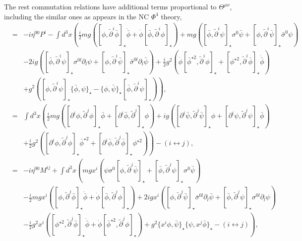\documentclass[a4paper,a4paper]{article}
\begin{document}
The rest commutation relations have additional
terms proportional to $\Theta^{\mu\nu}$, including the similar ones as appears 
in the NC $\Phi^4$ theory,  
\begin{eqnarray}
[M^{0i},P^0] & = & -i\eta^{00}P^i-\int d^3x \left(\frac i2 
mg([\phi,\tilde{\partial}^i\bar{\phi}]_\star \dot{\bar{\phi}}
   +\dot{\phi}[\bar{\phi},\tilde{\partial}^i\phi]_\star) 
\right.
+mg([\bar{\phi},\tilde{\partial}^i\psi]_\star\sigma^0\bar{\psi}
      +[\phi,\tilde{\partial}^i\bar{\psi}]_\star\bar{\sigma}^0\psi)\nonumber\\
&& -2ig([\bar{\phi},\tilde{\partial}^i\psi]_\star\sigma^{0l}\partial_l\psi
      +[\phi,\tilde{\partial}^i\bar{\psi}]_\star\bar{\sigma}^{0l}\partial_l\bar{\psi})
   +\frac i2 g^2(\dot{\phi}[\bar{\phi}^{\star 2},\tilde{\partial}^i\phi]_\star
               +[\phi^{\star 2},\tilde{\partial}^i\bar{\phi}]_\star\dot{\bar{\phi}})
\nonumber\\
&&\left.  +g^2([\phi,\tilde{\partial}^i\psi]_\star\{\bar{\phi},\psi\}_\star
       -\{\phi,\bar{\psi}\}_\star[\bar{\phi},\tilde{\partial}^i\psi]_\star)
 \right),
\end{eqnarray}
\begin{eqnarray}
[M^{ij},P^0] & = & \int d^3x \left(
\frac i2 mg([\partial^i\phi,\tilde{\partial}^j\phi]_\star\bar{\phi}
            +[\partial^i\bar{\phi},\tilde{\partial}^j]_\star\phi)
+ig([\partial^i\bar{\psi},\tilde{\partial}^j\bar{\psi}]_\star\phi
   +[\partial^i\psi,\tilde{\partial}^j\psi]_\star\bar{\phi})\right.\nonumber\\
&&\left.+\frac i2 g^2([\partial^i\phi,\tilde{\partial}^j\phi]_\star\bar{\phi}^{\star 2}
             +[\partial^i\bar{\phi},\tilde{\partial}^j\bar{\phi}]_\star\phi^{\star 2})
\right)-(i\leftrightarrow j),
\end{eqnarray}
\begin{eqnarray}
[M^{0i},M^{0j}]&=&-i\eta^{00}M^{ij}+\int d^3x \left(
mgx^i(\psi\sigma^0[\phi,\tilde{\partial}^j\bar{\psi}]_\star
     +[\bar{\phi},\tilde{\partial}^j\psi]_\star\sigma^0\bar{\psi})\right.\nonumber\\
&&-\frac i2 mgx^i([\phi,\tilde{\partial}^j\bar{\phi}]_\star\dot{\bar{\phi}}
                  +\dot{\phi}[\bar{\phi},\tilde{\partial}^j\phi]_\star)
  +2igx^i([\phi,\tilde{\partial}^j\bar{\psi}]_\star\bar{\sigma}^{0l}\partial_l\bar{\psi}
        +[\bar{\phi},\tilde{\partial}^j\psi]_\star\sigma^{0l}\partial_l\psi)\nonumber\\                  
&&\left.
  -\frac i2 g^2x^i([\phi^{\star 2},\tilde{\partial}^j\bar{\phi}]_\star\dot{\bar{\phi}}
                +\dot{\phi}[\bar{\phi}^{\star 2},\tilde{\partial}^j\phi]_\star)
       +g^2\{x^i\phi,\bar{\psi}\}_\star\{\psi,x^j\bar{\phi}\}_\star
       -(i\leftrightarrow j)\right),         
\end{eqnarray}
\end{document}
